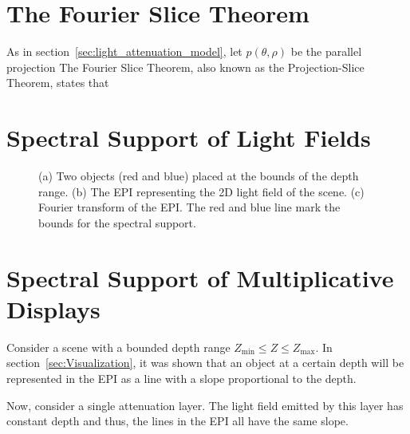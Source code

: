 \section{The Fourier Slice Theorem}

As in section~\ref{sec:light_attenuation_model}, let $p(\theta, \rho)$ be the parallel projection
The Fourier Slice Theorem, also known as the Projection-Slice Theorem, states that 


\section{Spectral Support of Light Fields}

\begin{figure}
	\subfigure[]{
		
		\label{fig:two_objects}
	}
	\hfill
	\subfigure[]{
		
		\label{fig:epi_two_objects}
	}
	\hfill
	\subfigure[]{
		
		\label{fig:epi_fourier_transform_1}
	}
	\caption{(a) Two objects (red and blue) placed at the bounds of the depth range. 
			 (b) The EPI representing the 2D light field of the scene.
			 (c) Fourier transform of the EPI. The red and blue line mark the bounds for the spectral support.}
\end{figure}


\section{Spectral Support of Multiplicative Displays}
\label{sec:Spectral_Support}

Consider a scene with a bounded depth range $Z_{\text{min}} \leq Z \leq Z_{\text{max}}$.
In section~\ref{sec:Visualization}, it was shown that an object at a certain depth will be represented in the EPI as a line with a slope proportional to the depth.



Now, consider a single attenuation layer. 
The light field emitted by this layer has constant depth and thus, the lines in the EPI all have the same slope.


